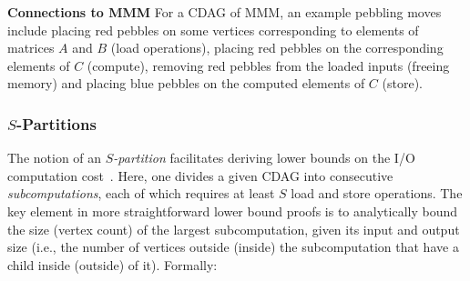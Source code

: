 \documentclass[sigplan,review,anonymous]{acmart}\settopmatter{printfolios=true,printccs=false,printacmref=false}
\newcommand{\macb}[1]{\textbf{\textsf{#1}}}
\begin{document}


\macb{Connections to MMM}
%
For a CDAG of MMM, an example pebbling moves include placing red pebbles on 
some vertices
corresponding to elements of matrices $A$ and $B$ (load operations), placing red
pebbles on the corresponding elements of $C$ (compute), removing red
pebbles from the loaded inputs (freeing memory) and placing blue pebbles on the
computed elements of $C$ (store). 

\subsubsection{$S$-Partitions}

The notion of an \emph{$S$-partition} facilitates deriving lower bounds on the
I/O computation cost~\cite{redblue}. Here, one divides a given CDAG into
consecutive \emph{subcomputations}, each of which requires at least $S$ load 
and store
operations. The key element in more straightforward
lower bound proofs is to analytically bound the size (vertex count) of
the largest subcomputation, given its input and output size (i.e., the number
of vertices outside (inside) the subcomputation that have a child inside
(outside) of it). 
%
%
%
%
%
Formally:
\end{document}
